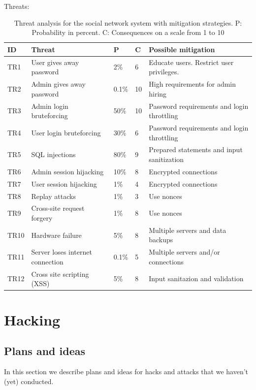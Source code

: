\documentclass[a4paper]{article}
\begin{document}
Threats:
\begin{table}[h!]
	\begin{tabular}{| l | p{4cm} | l | l | p{5cm} |}
		\hline
		\textbf{ID} & \textbf{Threat} & \textbf{P} & \textbf{C} & \textbf{Possible mitigation} \\ \hline
		TR1 & User gives away password & 2\% & 6 & Educate users. Restrict user privileges. \\ \hline
        TR2 & Admin gives away password & 0.1\%  & 10 & High requirements for admin hiring \\ \hline
        TR3 & Admin login bruteforcing & 50\% & 10 & Password requirements and login throttling \\ \hline
        TR4 & User login bruteforcing & 30\% & 6 & Password requirements and login throttling \\ \hline
        TR5 & SQL injections & 80\% & 9 & Prepared statements and input sanitization \\ \hline
        TR6 & Admin session hijacking & 10\% & 8 & Encrypted connections \\ \hline
        TR7 & User session hijacking & 1\% & 4 & Encrypted connections \\ \hline
        TR8 & Replay attacks & 1\% & 3 & Use nonces \\ \hline
       	TR9 & Cross-site request forgery & 1\% & 8 & Use nonces \\ \hline
        TR10 & Hardware failure & 5\% & 8 & Multiple servers and data backups \\ \hline
        TR11 & Server loses internet connection & 0.1\% & 5 & Multiple servers and/or connections \\ \hline
        TR12 & Cross site scripting (XSS) & 5\% & 8 & Input sanitazion and validation \\ \hline
	\end{tabular}
	\caption{Threat analysis for the social network system with mitigation strategies. P: Probability in percent. C: Consequences on a scale from 1 to 10}
		\label{tab:threats}
\end{table}


\section{Hacking}
\subsection{Plans and ideas}
In this section we describe plans and ideas for hacks and attacks that we haven't (yet) conducted.
\end{document}
